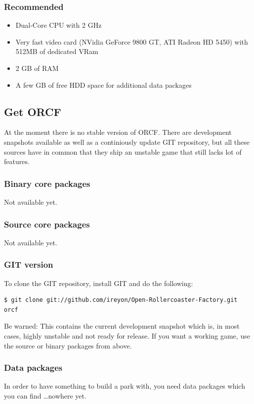 \documentclass[a4paper]{article}
\begin{document}
\subsubsection{Recommended}
\label{sysrecomm}
\begin{itemize}
  \item Dual-Core CPU with 2 GHz
  \item Very fast video card (NVidia GeForce 9800 GT, ATI Radeon HD 5450) with 512MB of dedicated VRam
  \item 2 GB of RAM
  \item A few GB of free HDD space for additional data packages
\end{itemize}


\subsection{Get ORCF}
At the moment there is no stable version of ORCF. There are development snapshots available as well as a continiously update GIT repository,
but all these sources have in common that they ship an unstable game that still lacks lot of features.

\subsubsection{Binary core packages}
Not available yet.

\subsubsection{Source core packages}
Not available yet.

\subsubsection{GIT version}
To clone the GIT repository, install GIT and do the following:
\begin{lstlisting}
$ git clone git://github.com/ireyon/Open-Rollercoaster-Factory.git orcf
\end{lstlisting}
Be warned: This contains the current development snapshot which is, in most cases, highly unstable and not ready for release.
If you want a working game, use the source or binary packages from above.

\subsubsection{Data packages}
In order to have something to build a park with, you need data packages which you can find \dots nowhere yet.
\end{document}
